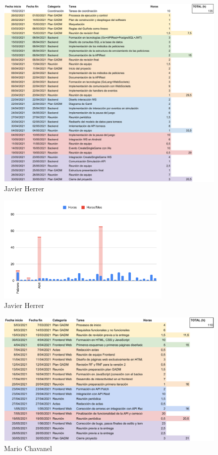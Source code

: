 \documentclass{article}
\begin{document}
\begin{figure}[h]
    \centering
    \includegraphics[width=\textwidth]{../images/horasTrabajadas/javier-herrer.pdf}
    \caption{Javier Herrer}
\end{figure}

\begin{figure}[h]
    \centering
    \includegraphics[width=0.75\textwidth]{../images/graficos/HERRER}
    \caption{Javier Herrer}
\end{figure}

\begin{figure}[h]
    \centering
    \includegraphics[width=\textwidth]{../images/horasTrabajadas/mario-chavanel.pdf}
    \caption{Mario Chavanel}
\end{figure}
\end{document}
